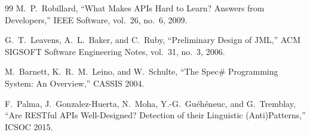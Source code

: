 \documentclass[11pt]{article}
\begin{document}
\begin{thebibliography}{99}
M.~P.~Robillard, ``What Makes APIs Hard to Learn? Answers from
Developers,'' IEEE Software, vol.~26, no.~6, 2009.

G.~T.~Leavens, A.~L.~Baker, and C.~Ruby, ``Preliminary Design of JML,''
ACM SIGSOFT Software Engineering Notes, vol.~31, no.~3, 2006.

M.~Barnett, K.~R.~M.~Leino, and W.~Schulte, ``The Spec\# Programming
System: An Overview,'' CASSIS 2004.

F.~Palma, J.~Gonzalez-Huerta, N.~Moha, Y.-G.~Gu{\'e}h{\'e}neuc, and
G.~Tremblay, ``Are RESTful APIs Well-Designed? Detection of their
Linguistic (Anti)Patterns,'' ICSOC 2015.

\end{thebibliography}
\end{document}
